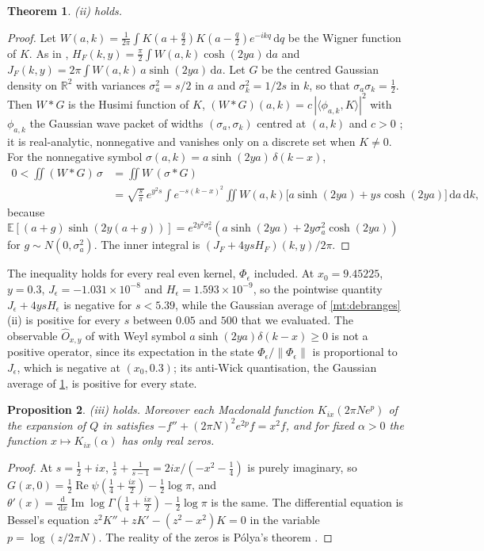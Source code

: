 \documentclass[11pt]{article}
\newtheorem{theorem}{Theorem}[section]
\newtheorem{proposition}[theorem]{Proposition}
\theoremstyle{definition}\newtheorem{definition}[theorem]{Definition}
\theoremstyle{remark}\newtheorem{remark}[theorem]{Remark}
\newcommand{\R}{\mathbb R}\newcommand{\C}{\mathbb C}\newcommand{\N}{\mathbb N}
\newcommand{\dd}{\,\mathrm d}\newcommand{\e}{\mathrm e}
\renewcommand{\Re}{\operatorname{Re}}\renewcommand{\Im}{\operatorname{Im}}
\begin{document}
\begin{theorem}\label{thm:husimi}
(ii) holds.
\end{theorem}
\begin{proof}
Let $W(a,k)=\frac1{2\pi}\int K(a+\frac q2)K(a-\frac q2)e^{-ikq}\dd q$ be the Wigner function of $K$. As in \cite[Prop.~11.1]{S01}, $H_F(k,y)=\frac\pi2\int W(a,k)\cosh(2ya)\dd a$ and $J_F(k,y)=2\pi\int W(a,k)\,a\sinh(2ya)\dd a$. Let $G$ be the centred Gaussian density on $\R^2$ with variances $\sigma_a^2=s/2$ in $a$ and $\sigma_k^2=1/2s$ in $k$, so that $\sigma_a\sigma_k=\frac12$. Then $W*G$ is the Husimi function of $K$, $(W*G)(a,k)=c\,|\langle\phi_{a,k},K\rangle|^2$ with $\phi_{a,k}$ the Gaussian wave packet of widths $(\sigma_a,\sigma_k)$ centred at $(a,k)$ and $c>0$ \cite{Cartwright}; it is real-analytic, nonnegative and vanishes only on a discrete set when $K\ne0$. For the nonnegative symbol $\sigma(a,k)=a\sinh(2ya)\,\delta(k-x)$,
\begin{align*}
0<\iint(W*G)\,\sigma&=\iint W\,(\sigma*G)\\
&=\sqrt{\frac s\pi}\,e^{y^2s}\int e^{-s(k-x)^2}\iint W(a,k)\bigl[a\sinh(2ya)+ys\cosh(2ya)\bigr]\dd a\dd k,
\end{align*}
because $\mathbb E[(a+g)\sinh(2y(a+g))]=e^{2y^2\sigma_a^2}(a\sinh(2ya)+2y\sigma_a^2\cosh(2ya))$ for $g\sim N(0,\sigma_a^2)$. The inner integral is $(J_F+4ysH_F)(k,y)/2\pi$.
\end{proof}

The inequality holds for every real even kernel, $\Phi_\epsilon$ included. At $x_0=9.45225$, $y=0.3$, $J_\epsilon=-1.031\times10^{-8}$ and $H_\epsilon=1.593\times10^{-9}$, so the pointwise quantity $J_\epsilon+4ysH_\epsilon$ is negative for $s<5.39$, while the Gaussian average of \cref{mt:debranges}(ii) is positive for every $s$ between $0.05$ and $500$ that we evaluated. The observable $\hat O_{x,y}$ of \cite{S01,S03} with Weyl symbol $a\sinh(2ya)\delta(k-x)\ge0$ is not a positive operator, since its expectation in the state $\Phi_\epsilon/\|\Phi_\epsilon\|$ is proportional to $J_\epsilon$, which is negative at $(x_0,0.3)$; its anti-Wick quantisation, the Gaussian average of \cref{thm:husimi}, is positive for every state.

\begin{proposition}\label{prop:arch}
(iii) holds. Moreover each Macdonald function $K_{ix}(2\pi Ne^p)$ of the expansion of $Q$ in \cite{S01} satisfies $-f''+(2\pi N)^2e^{2p}f=x^2f$, and for fixed $\alpha>0$ the function $x\mapsto K_{ix}(\alpha)$ has only real zeros.
\end{proposition}
\begin{proof}
At $s=\frac12+ix$, $\frac1s+\frac1{s-1}=2ix/(-x^2-\frac14)$ is purely imaginary, so $G(x,0)=\frac12\Re\psi(\frac14+\frac{ix}2)-\frac12\log\pi$, and $\theta'(x)=\frac{\dd}{\dd x}\Im\log\Gamma(\frac14+\frac{ix}2)-\frac12\log\pi$ is the same. The differential equation is Bessel's equation $z^2K''+zK'-(z^2-x^2)K=0$ in the variable $p=\log(z/2\pi N)$. The reality of the zeros is P\'olya's theorem \cite{Polya26}.
\end{proof}
\end{document}

